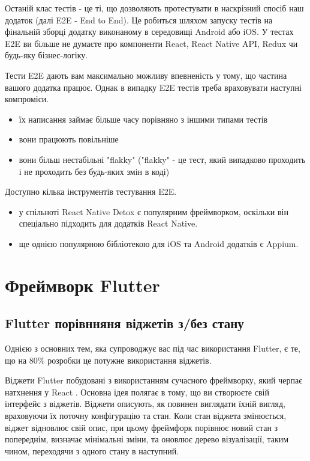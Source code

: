 Останій клас тестів - це ті, що дозволяють протестувати в наскрізний спосіб наш додаток (далі E2E - End to End).
Це робиться шляхом запуску тестів на фінальній зборці додатку виконаному в середовищі Android або iOS.
У тестах E2E ви більше не думаєте про компоненти React, React Native API, Redux чи будь-яку бізнес-логіку.

Тести E2E дають вам максимально можливу впевненість у тому, що частина вашого додатка працює.
Однак в випадку E2E тестів треба враховувати наступні компроміси.

\begin{itemize}
    \item їх написання займає більше часу порівняно з іншими типами тестів
    \item вони працюють повільніше
    \item вони більш нестабільні "flakky" ("flakky"  - це тест, який випадково проходить і не проходить без будь-яких змін в коді)
\end{itemize}

Доступно кілька інструментів тестування E2E.
\begin{itemize}
    \item у спільноті React Native Detox є популярним фреймворком, оскільки він спеціально підходить для додатків React Native.\cite{detox_home_page}
    \item ще однією популярною бібліотекою для iOS та Android додатків є Appium.\cite{appium_home_page}
\end{itemize}


\section{Фреймворк Flutter}
\label{sec:flutter}

\subsection{Flutter порівнняня віджетів з/без стану}
\label{subsec:flutter_widgets_theory}
Однією з основних тем, яка супроводжує вас під час використання Flutter, є те, що на 80\% розробки це потужне використання віджетів.

Віджети Flutter побудовані з використанням сучасного фреймворку, який черпає натхнення у React \cite{flutter_widgets_intro}.
Основна ідея полягає в тому, що ви створюєте свій інтерфейс з віджетів.
Віджети описують, як повинен виглядати їхній вигляд, враховуючи їх поточну конфігурацію та стан.
Коли стан віджета змінюється, віджет відновлює свій опис, при цьому фреймфорк порівнює новий стан з попереднім,
визначає мінімальні зміни, та оновлює дерево візуалізації, таким чином, переходячи з одного стану в наступний.

